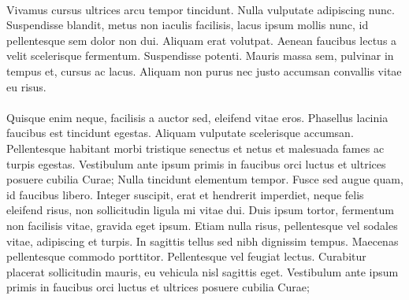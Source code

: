 \paragraph{}
Vivamus cursus ultrices arcu tempor tincidunt. Nulla vulputate adipiscing nunc. Suspendisse blandit, metus non iaculis facilisis, lacus ipsum mollis nunc, id pellentesque sem dolor non dui. Aliquam erat volutpat. Aenean faucibus lectus a velit scelerisque fermentum. Suspendisse potenti. Mauris massa sem, pulvinar in tempus et, cursus ac lacus. Aliquam non purus nec justo accumsan convallis vitae eu risus.

\paragraph{}
Quisque enim neque, facilisis a auctor sed, eleifend vitae eros. Phasellus lacinia faucibus est tincidunt egestas. Aliquam vulputate scelerisque accumsan. Pellentesque habitant morbi tristique senectus et netus et malesuada fames ac turpis egestas. Vestibulum ante ipsum primis in faucibus orci luctus et ultrices posuere cubilia Curae; Nulla tincidunt elementum tempor. Fusce sed augue quam, id faucibus libero. Integer suscipit, erat et hendrerit imperdiet, neque felis eleifend risus, non sollicitudin ligula mi vitae dui. Duis ipsum tortor, fermentum non facilisis vitae, gravida eget ipsum. Etiam nulla risus, pellentesque vel sodales vitae, adipiscing et turpis. In sagittis tellus sed nibh dignissim tempus. Maecenas pellentesque commodo porttitor. Pellentesque vel feugiat lectus. Curabitur placerat sollicitudin mauris, eu vehicula nisl sagittis eget. Vestibulum ante ipsum primis in faucibus orci luctus et ultrices posuere cubilia Curae;

